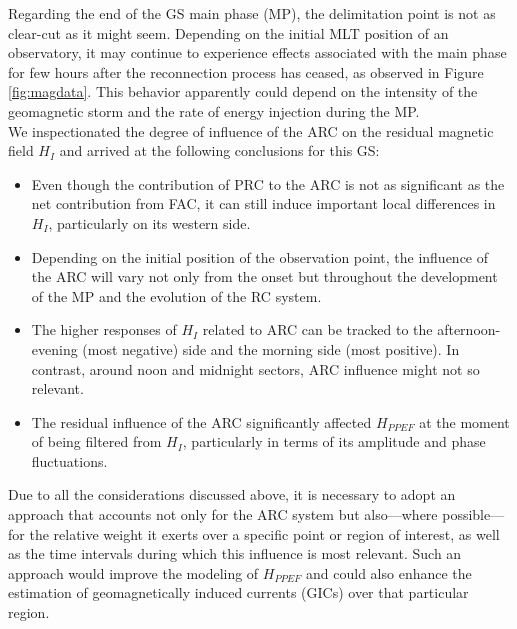 \documentclass[a4paper]{article}
\theoremstyle{plain}
\theoremstyle{definition}
\begin{document}
 	Regarding the end of the GS main phase (MP), the delimitation point is not as clear-cut as it might seem. Depending on the initial MLT position of an observatory, it may continue to experience effects associated with the main phase for few hours after the reconnection process has ceased, as observed in Figure \ref{fig:magdata}. This behavior apparently could depend on the intensity of the geomagnetic storm and the rate of energy injection during the MP.\\
	
	We inspectionated the degree of influence of the ARC on the residual magnetic field $H_I$ and arrived at the following conclusions for this GS:
	
	\begin{itemize}
				
				
		\item Even though the contribution of PRC to the ARC is not as significant as the net contribution from FAC, it can still induce important local differences in $H_I$, particularly on its western side.
		
		\item Depending on the initial position of the observation point, the influence of the ARC will vary not only from the onset but throughout the development of the MP and the evolution of the RC system.
		
		\item The higher responses of $H_I$ related to ARC can be tracked to the afternoon-evening (most negative) side and the morning side (most positive). In contrast, around noon and midnight sectors, ARC influence might not so relevant.
		
		\item The residual influence of the ARC significantly affected $H_{PPEF}$ at the moment of being filtered from $H_I$, particularly in terms of its amplitude and phase fluctuations.
	\end{itemize}  
	
	
	Due to all the considerations discussed above, it is necessary to adopt an approach that accounts not only for the ARC system but also—where possible—for the relative weight it exerts over a specific point or region of interest, as well as the time intervals during which this influence is most relevant. Such an approach would improve the modeling of $H_{PPEF}$ and could also enhance the estimation of geomagnetically induced currents (GICs) over that particular region.
\end{document}
